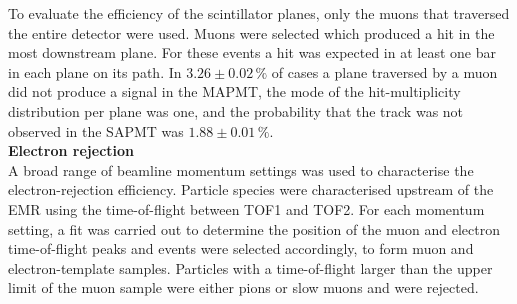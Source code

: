 To evaluate the efficiency of the scintillator planes, only the muons
that traversed the entire detector were used.
Muons were selected which produced a hit in the most downstream plane.
For these events a hit was expected in at least one bar in each plane
on its path.
In $3.26\pm0.02\,\%$ of cases a plane traversed by a muon did not
produce a signal in the MAPMT, the mode of the hit-multiplicity
distribution per plane was one, and the probability that the track was
not observed in the SAPMT was $1.88\pm0.01\,\%$. \\

\noindent\textbf{Electron rejection} \\
\noindent
A broad range of beamline momentum settings was used to characterise
the electron-rejection efficiency.
Particle species were characterised upstream of the EMR using the
time-of-flight between TOF1 and TOF2.
For each momentum setting, a fit was carried out to determine
the position of the muon and electron time-of-flight peaks and events were
selected accordingly, to form muon and electron-template samples.
Particles with a time-of-flight larger than the upper limit of the
muon sample were either pions or slow muons and were rejected.

